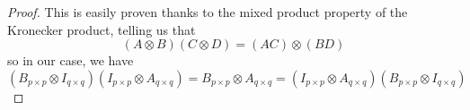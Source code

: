 \begin{proof}
	This is easily proven thanks to the mixed product property of the Kronecker product, telling us that 
	\[ (A \otimes B)(C \otimes D) = (AC)\otimes(BD)
	\]
	so in our case, we have 
	\[
	(B_{p\times p} \otimes I_{q\times q}) (I_{p\times p} \otimes A_{q\times q}) = B_{p\times p} \otimes A_{q \times q} = (I_{p\times p} \otimes A_{q\times q}) (B_{p\times p} \otimes I_{q\times q})
	\]	
	
	


\end{proof}
